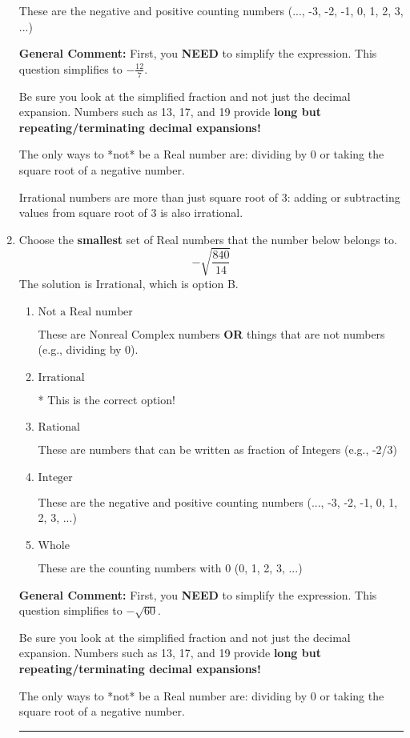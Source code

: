 \documentclass{extbook}[14pt]
\newcommand{\litem}[1]{\item #1

\rule{\textwidth}{0.4pt}}
\begin{document}
\begin{enumerate}
{\begin{enumerate}[label=\Alph*.]
These are the negative and positive counting numbers (..., -3, -2, -1, 0, 1, 2, 3, ...)
\end{enumerate}

\textbf{General Comment:} First, you \textbf{NEED} to simplify the expression. This question simplifies to $-\frac{12}{7}$. 
 
 Be sure you look at the simplified fraction and not just the decimal expansion. Numbers such as 13, 17, and 19 provide \textbf{long but repeating/terminating decimal expansions!} 
 
 The only ways to *not* be a Real number are: dividing by 0 or taking the square root of a negative number. 
 
 Irrational numbers are more than just square root of 3: adding or subtracting values from square root of 3 is also irrational.
}
\litem{
Choose the \textbf{smallest} set of Real numbers that the number below belongs to.
\[ -\sqrt{\frac{840}{14}} \]The solution is \( \text{Irrational} \), which is option B.\begin{enumerate}[label=\Alph*.]
\item \( \text{Not a Real number} \)

These are Nonreal Complex numbers \textbf{OR} things that are not numbers (e.g., dividing by 0).
\item \( \text{Irrational} \)

* This is the correct option!
\item \( \text{Rational} \)

These are numbers that can be written as fraction of Integers (e.g., -2/3)
\item \( \text{Integer} \)

These are the negative and positive counting numbers (..., -3, -2, -1, 0, 1, 2, 3, ...)
\item \( \text{Whole} \)

These are the counting numbers with 0 (0, 1, 2, 3, ...)
\end{enumerate}

\textbf{General Comment:} First, you \textbf{NEED} to simplify the expression. This question simplifies to $-\sqrt{60}$. 
 
 Be sure you look at the simplified fraction and not just the decimal expansion. Numbers such as 13, 17, and 19 provide \textbf{long but repeating/terminating decimal expansions!} 
 
 The only ways to *not* be a Real number are: dividing by 0 or taking the square root of a negative number. 
 
}
\end{enumerate}
\end{document}
